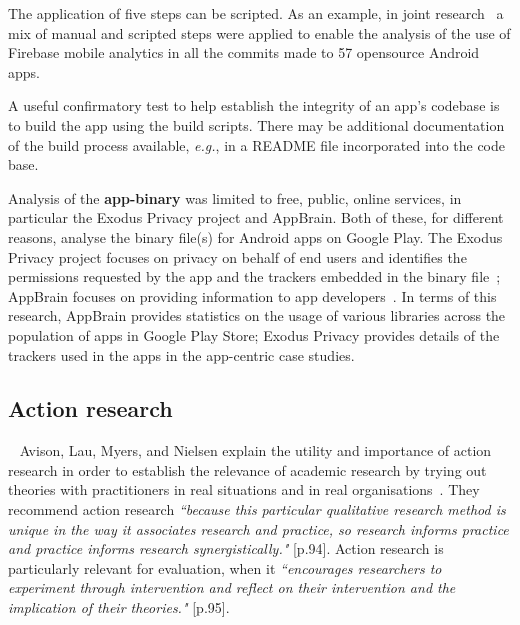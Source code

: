 The application of five steps can be scripted. As an example, in joint research~ a mix of manual and scripted steps were applied to enable the analysis of the use of Firebase mobile analytics in all the commits made to 57 opensource Android apps.

A useful confirmatory test to help establish the integrity of an app's codebase is to build the app using the build scripts. There may be additional documentation of the build process available, \textit{e.g.}, in a README file incorporated into the code base.

Analysis of the \textbf{app-binary} was limited to free, public, online services, in particular the Exodus Privacy project and AppBrain. Both of these, for different reasons, analyse the binary file(s) for Android apps on Google Play. The Exodus Privacy project focuses on privacy on behalf of end users and identifies the permissions requested by the app and the trackers embedded in the binary file~; AppBrain focuses on providing information to app developers~. In terms of this research, AppBrain provides statistics on the usage of various libraries across the population of apps in Google Play Store; Exodus Privacy provides details of the trackers used in the apps in the app-centric case studies.


\subsection{Action research}~\label{section-action-research-method}
Avison, Lau, Myers, and Nielsen explain the utility and importance of action research in order to establish the relevance of academic research by trying out theories with practitioners in real situations and in real organisations~. They recommend action research \emph{``because this particular qualitative research method is unique in the way it associates research and practice, so research informs practice and practice informs research synergistically."} [p.94]. Action research is particularly relevant for evaluation, when it \emph{``encourages researchers to experiment through intervention and reflect on their intervention and the implication of their theories."} [p.95]. 

